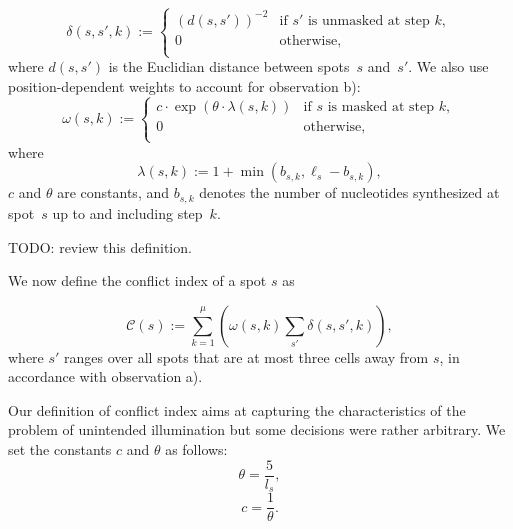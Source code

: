 \documentclass{bioinfo}
\begin{document}
\begin{equation}
\label{eq:dist_weight}
\delta(s,s',k) :=
        \left\{
                \begin{array}{ll}
                        (d(s,s'))^{-2} & \mbox{if $s'$ is unmasked at step $k$}, \\
                        0 & \mbox{otherwise}, \\
                \end{array}
        \right.
\end{equation}
where $d(s,s')$ is the Euclidian distance between spots~$s$ and~$s'$. We also use position-dependent weights to account for observation b):
\begin{equation}
\label{eq:pos_mult}
\omega(s,k) :=
        \left\{
                \begin{array}{ll}
                        c \cdot \exp{\left(\theta \cdot \lambda(s,k)\right)} & \mbox{if $s$ is masked at step $k$}, \\
                        0 & \mbox{otherwise}, \\
                \end{array}
        \right.
\end{equation}
where
\begin{equation}
\label{eq:base_pos}
\lambda(s,k) := 1 + \min(b_{s,k},\ell_{s} - b_{s,k}),
\end{equation}
$c$ and $\theta$ are constants, and $b_{s,k}$ denotes the number of nucleotides synthesized at spot~$s$ up to and including step~$k$.

TODO: review this definition.

We now define the conflict index of a spot $s$ as

\begin{equation}
\label{eq:conf_idx}
\mathcal{C}(s) := \sum_{k=1}^{\mu} \left( \omega(s,k) \sum_{s'} \delta(s,s',k) \right),
\end{equation}
where $s'$ ranges over all spots that are at most three cells away from $s$, in accordance with observation a).

Our definition of conflict index aims at capturing the characteristics of the problem of unintended illumination but some decisions were rather arbitrary. We set the constants $c$ and $\theta$ as follows:
\begin{displaymath}
\theta = \frac{5}{l_s},
\end{displaymath}
\begin{displaymath}
c = \frac{1}{\theta}.
\end{displaymath}
\end{document}
